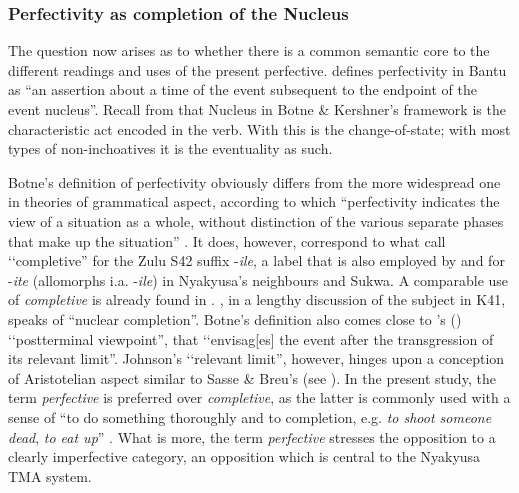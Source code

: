 \subsubsection{Perfectivity as completion of the Nucleus}\label{PerfectivityCompletion}
The question now arises as to whether there is a common semantic core to the different readings and uses of the present perfective. \citet[43]{BotneR2010b} defines perfectivity in Bantu as ``an assertion about a time of the event subsequent to the endpoint of the event nucleus''. Recall from  that Nucleus in Botne \& Kershner's framework is the characteristic act encoded in the verb. With  this is the change-of-state; with most types of non-inchoatives it is the eventuality as such.



Botne's definition of perfectivity obviously differs from the more widespread one in theories of grammatical aspect, according to which ``perfectivity indicates the view of a situation as a whole, without distinction of the various separate phases that make up the situation'' \citep[16]{ComrieB1976}. It does, however, correspond to what \citet{BotneRKershnerT2000} call \lq\lq completive'' for the Zulu S42 suffix \mbox{-\textit{ile}}, a label that is also employed by \citet{BotneR2008} and \citet{KershnerT2002} for \mbox{-\textit{ite}} (allomorphs i.a. \mbox{-\textit{ile}}) in Nyakyusa's neighbours  and Sukwa. A comparable use of \textit{completive} is already found in \citet{WelmersW1974}. \citet[118--142]{CraneTM2011}, in a lengthy discussion of the subject in  K41, speaks of ``nuclear completion''. Botne's definition also comes close to \citeauthor{JohansonL2000}'s (\citeyear[29]{JohansonL2000}) \lq\lq postterminal viewpoint'', that \lq\lq envisag[es] the event after the transgression of its relevant limit''. Johnson's \lq\lq relevant limit'', however, hinges upon a conception of Aristotelian aspect similar to Sasse \& Breu's (see ). In the present study, the term \textit{perfective} is preferred over \textit{completive}, as the latter is commonly used with a sense of ``to do something thoroughly and to completion, e.g. \textit{to shoot someone dead}, \textit{to eat up}'' \citep[318]{BybeePerkinsPaglucia1994}. What is more, the term \textit{perfective} stresses the opposition to a clearly imperfective category, an opposition which is central to the Nyakyusa TMA system.

